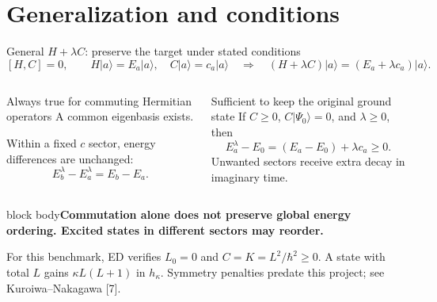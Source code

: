 \documentclass[aspectratio=169,10pt]{beamer}
\newcommand{\src}[1]{\vfill{\fontsize{6.3}{7.5}\selectfont\color{muted}#1\par}}
\newcommand{\take}[1]{\vspace{1mm}\begin{beamercolorbox}[sep=1.6mm,wd=\textwidth]{block body}\small\color{teal}\textbf{#1}\end{beamercolorbox}}
\newcommand{\ket}[1]{\lvert #1\rangle}
\begin{document}
\section{Generalization and conditions}
\begin{frame}{General $H+\lambda C$: preserve the target under stated conditions}
\[
[H,C]=0,\qquad H\ket a=E_a\ket a,\quad C\ket a=c_a\ket a
\quad\Longrightarrow\quad
(H+\lambda C)\ket a=(E_a+\lambda c_a)\ket a.
\]
\begin{columns}[T,onlytextwidth]
\begin{block}{Always true for commuting Hermitian operators}
\small A common eigenbasis exists.\par\medskip
Within a fixed $c$ sector, energy differences are unchanged:
\[
E_b^\lambda-E_a^\lambda=E_b-E_a.
\]
\end{block}
\begin{block}{Sufficient to keep the original ground state}
\small If $C\geq0$, $C\ket{\Psi_0}=0$, and $\lambda\geq0$, then
\[
E_a^\lambda-E_0=(E_a-E_0)+\lambda c_a\geq0.
\]
Unwanted sectors receive extra decay in imaginary time.
\end{block}
\end{columns}
\take{Commutation alone does not preserve global energy ordering. Excited states in different sectors may reorder.}
\src{For this benchmark, ED verifies $L_0=0$ and $C=K=L^2/\hbar^2\geq0$. A state with total $L$ gains $\kappa L(L+1)$ in $h_\kappa$. Symmetry penalties predate this project; see Kuroiwa--Nakagawa [7].}
\end{frame}
\end{document}
